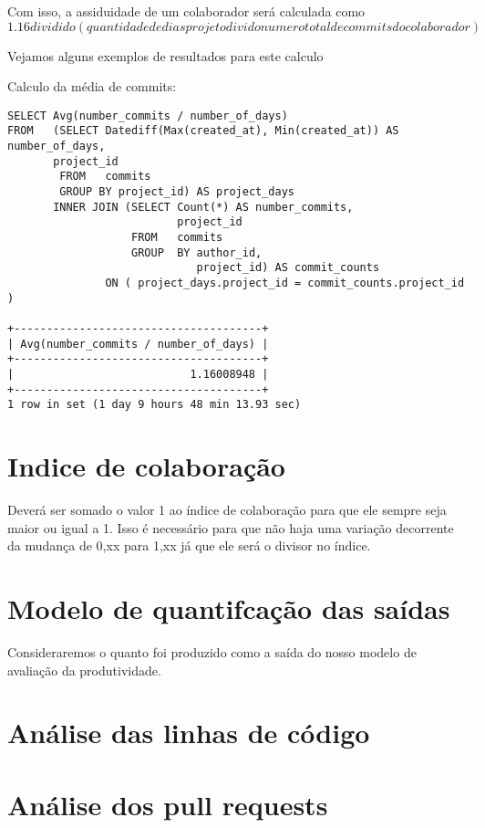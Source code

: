 Com isso, a assiduidade de um colaborador será calculada como $1.16 dividido  (quantidade de dias projeto divido  numero total de commits do colaborador)$

Vejamos alguns exemplos de resultados para este calculo


Calculo da média de commits:

\begin{lstlisting}
SELECT Avg(number_commits / number_of_days) 
FROM   (SELECT Datediff(Max(created_at), Min(created_at)) AS number_of_days, 
       project_id 
        FROM   commits 
        GROUP BY project_id) AS project_days 
       INNER JOIN (SELECT Count(*) AS number_commits, 
                          project_id 
                   FROM   commits 
                   GROUP  BY author_id, 
                             project_id) AS commit_counts 
               ON ( project_days.project_id = commit_counts.project_id )
               
+--------------------------------------+
| Avg(number_commits / number_of_days) |
+--------------------------------------+
|                           1.16008948 |
+--------------------------------------+
1 row in set (1 day 9 hours 48 min 13.93 sec) 

\end{lstlisting}

\section{Indice de colaboração}

Deverá ser somado o valor 1 ao índice de colaboração para que ele sempre seja maior ou igual a 1. Isso é necessário para que não haja uma variação decorrente da mudança de 0,xx para 1,xx já que ele será o divisor no índice. 



\section{Modelo de quantifcação das saídas}

Consideraremos o quanto foi produzido como a saída do nosso modelo de avaliação da produtividade. 

\section{Análise das linhas de código}

\section{Análise dos pull requests}

